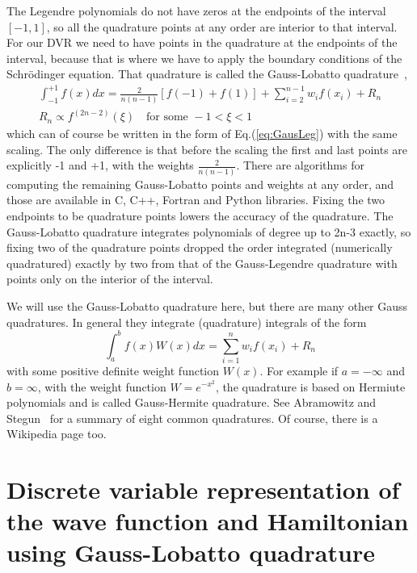 \documentclass[aps,amssymb,superscriptaddress,floatfix]{revtex4}
\begin{document}
The Legendre polynomials do not have zeros at the endpoints of the interval $[-1,1]$, so all the quadrature points at any order are interior to that interval.  For our DVR we need to have points in the quadrature at the endpoints of the interval, because that is where we have to apply the boundary conditions of the Schr\"odinger equation.  That quadrature is called the Gauss-Lobatto quadrature~\cite{abramowitz+stegun},
\begin{equation}
\begin{split}
\int_{-1}^{+1} f(x) dx = \frac{2}{n(n-1)}[f(-1) + f(1)] + \sum_{i=2}^{n-1} w_i f(x_i) + R_n \\
R_n \propto f^{(2n-2)}(\xi)  \quad \textrm{for some } -1< \xi <1
\end{split}
\end{equation}
which can of course be written in the form of Eq.(\ref{eq:GausLeg}) with the same scaling. The only difference is that before the scaling the first and last points are explicitly -1 and +1, with the weights $ \frac{2}{n(n-1)}$.    There are algorithms for computing the remaining Gauss-Lobatto points and weights at any order, and those are available in C, C++, Fortran and Python libraries.  Fixing the two endpoints to be quadrature points lowers the accuracy of the quadrature.  The Gauss-Lobatto quadrature integrates polynomials of degree up to 2n-3 exactly, so fixing two of the quadrature points dropped the order integrated (numerically quadratured) exactly by two from that of the Gauss-Legendre quadrature with points only on the interior of the interval.

We will use the Gauss-Lobatto quadrature here, but there are many other Gauss quadratures.  In general they integrate (quadrature) integrals of the form 
\begin{equation}
\int_{a}^{b} f(x) W(x) dx =  \sum_{i=1}^n w_i f(x_i) + R_n
\end{equation}
with some positive definite weight function $W(x)$.  For example if $a=-\infty$ and $b=\infty$, with the weight function $W=e^{-x^2}$, the quadrature is based on Hermiute polynomials and is called Gauss-Hermite quadrature.  See Abramowitz and Stegun~\cite{abramowitz+stegun} for a summary of eight common quadratures.  Of course, there is a Wikipedia page too.


\section{Discrete variable representation of the wave function and Hamiltonian using Gauss-Lobatto quadrature}
\label{sec:DVR}
\end{document}
